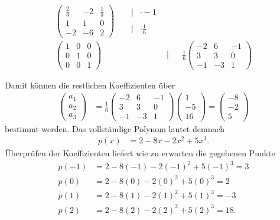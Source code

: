 \documentclass[english, parskip=full]{scrartcl}
\begin{document}
\begin{align}
\begin{pmatrix}
\frac{2}{3}&-2&\frac{1}{3}\\
1&1&0\\
-2&-6&2
\end{pmatrix}&&\begin{matrix}
\vert& \cdot -1 \\
& \\
\vert& \cdot \frac{1}{6}
\end{matrix}\\
\begin{pmatrix}
1&0&0 \\
0&1&0 \\
0&0&1 
\end{pmatrix}&&&\Bigg\vert&&\frac{1}{6}\begin{pmatrix}
-2&6&-1\\
3&3&0\\
-1&-3&1
\end{pmatrix}
\end{align}


Damit können die restlichen Koeffizienten über
\begin{align}
\begin{pmatrix}
a_1 \\ a_2 \\ a_3
\end{pmatrix}&=\frac{1}{6}\begin{pmatrix}
-2&6&-1\\
3&3&0\\
-1&-3&1
\end{pmatrix}\begin{pmatrix}
1\\ -5 \\ 16
\end{pmatrix}=\begin{pmatrix}
-8 \\ -2 \\ 5
\end{pmatrix}
\end{align}
bestimmt werden. 
Das vollständige Polynom lautet demnach
\begin{align}
p(x)&=2-8x-2x^2+5x^3.
\end{align}
Überprüfen der Koeffizienten liefert wie zu erwarten die gegebenen Punkte
\begin{align}
p(-1)&=2-8(-1)-2(-1)^2+5(-1)^3=3\\
p(0)&=2-8(0)-2(0)^2+5(0)^3=2\\
p(1)&=2-8(1)-2(1)^2+5(1)^3=-3\\
p(2)&=2-8(2)-2(2)^2+5(2)^3=18.
\end{align}
\end{document}
